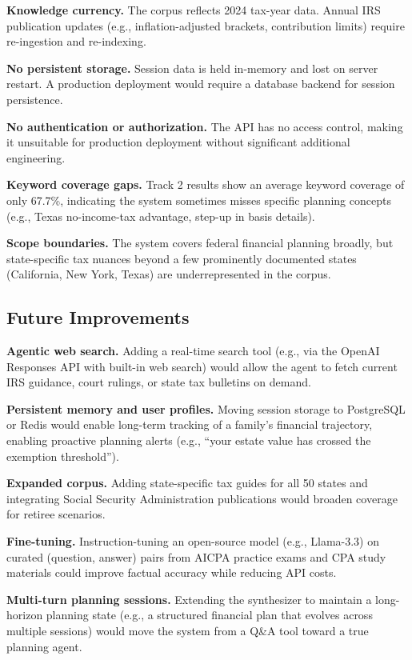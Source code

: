 \documentclass[sigplan,screen]{acmart}
\begin{document}
\textbf{Knowledge currency.}
The corpus reflects 2024 tax-year data.
Annual IRS publication updates (e.g., inflation-adjusted brackets, contribution limits) require re-ingestion and re-indexing.

\textbf{No persistent storage.}
Session data is held in-memory and lost on server restart.
A production deployment would require a database backend for session persistence.

\textbf{No authentication or authorization.}
The API has no access control, making it unsuitable for production deployment without significant additional engineering.

\textbf{Keyword coverage gaps.}
Track 2 results show an average keyword coverage of only 67.7\%, indicating the system sometimes misses specific planning concepts (e.g., Texas no-income-tax advantage, step-up in basis details).

\textbf{Scope boundaries.}
The system covers federal financial planning broadly, but state-specific tax nuances beyond a few prominently documented states (California, New York, Texas) are underrepresented in the corpus.

\subsection{Future Improvements}

\textbf{Agentic web search.}
Adding a real-time search tool (e.g., via the OpenAI Responses API with built-in web search) would allow the agent to fetch current IRS guidance, court rulings, or state tax bulletins on demand.

\textbf{Persistent memory and user profiles.}
Moving session storage to PostgreSQL or Redis would enable long-term tracking of a family's financial trajectory, enabling proactive planning alerts (e.g., ``your estate value has crossed the exemption threshold'').

\textbf{Expanded corpus.}
Adding state-specific tax guides for all 50 states and integrating Social Security Administration publications would broaden coverage for retiree scenarios.

\textbf{Fine-tuning.}
Instruction-tuning an open-source model (e.g., Llama-3.3) on curated (question, answer) pairs from AICPA practice exams and CPA study materials could improve factual accuracy while reducing API costs.

\textbf{Multi-turn planning sessions.}
Extending the synthesizer to maintain a long-horizon planning state (e.g., a structured financial plan that evolves across multiple sessions) would move the system from a Q\&A tool toward a true planning agent.
\end{document}

